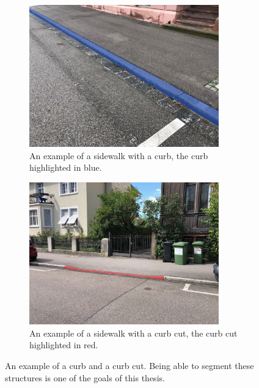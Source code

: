\begin{figure}[t]
    \centering
    \begin{subfigure}{0.45\textwidth}
    	\centering
    	\includegraphics[width=0.9\textwidth]{figures/background/curb.jpeg} %
    	\caption{An example of a sidewalk with a curb, the curb highlighted in blue.} \label{fig:background-curb}
    \end{subfigure}
	\hfill
    \begin{subfigure}{0.45\textwidth}
        \centering
        \includegraphics[width=0.9\textwidth]{figures/background/curbcut.jpeg} %
        \caption{An example of a sidewalk with a curb cut, the curb cut highlighted in red.} \label{fig:background-curbcut}
    \end{subfigure}
	\caption[Curbs and curb cuts]{An example of a curb and a curb cut. Being able to segment these structures is one of the goals of this thesis.}
\end{figure}